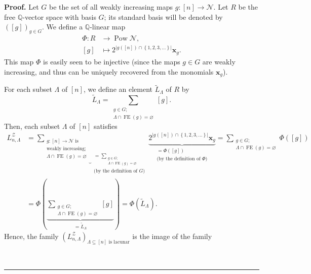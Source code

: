 \documentclass[numbers=enddot,12pt,final,onecolumn,notitlepage]{scrartcl}%
\theoremstyle{definition}
\newenvironment{proof}[1][Proof]{\noindent\textbf{#1.} }{\ \rule{0.5em}{0.5em}}
\let\sumnonlimits\sum
\renewcommand{\sum}{\sumnonlimits\limits}
\begin{document}
\begin{proof}
Let $G$ be the set of all weakly increasing maps $g:\left[  n\right]
\rightarrow\mathcal{N}$. Let $R$ be the free $\mathbb{Q}$-vector space with
basis $G$; its standard basis will be denoted by $\left(  \left[  g\right]
\right)  _{g\in G}$. We define a $\mathbb{Q}$-linear map%
\begin{align*}
\Phi:R  &  \rightarrow\operatorname*{Pow}\mathcal{N},\\
\left[  g\right]   &  \mapsto2^{\left\vert g\left(  \left[  n\right]  \right)
\cap\left\{  1,2,3,\ldots\right\}  \right\vert }\mathbf{x}_{g}.
\end{align*}
This map $\Phi$ is easily seen to be injective (since the maps $g\in G$ are
weakly increasing, and thus can be uniquely recovered from the monomials
$\mathbf{x}_{g}$).

For each subset $\Lambda$ of $\left[  n\right]  $, we define an element
$\widetilde{L}_{\Lambda}$ of $R$ by%
\[
\widetilde{L}_{\Lambda}=\sum_{\substack{g\in G;\\\Lambda\cap\operatorname*{FE}%
\left(  g\right)  =\varnothing}}\left[  g\right]  .
\]
Then, each subset $\Lambda$ of $\left[  n\right]  $ satisfies%
\begin{align*}
L_{n,\Lambda}^{\mathcal{Z}}  &  =\underbrace{\sum_{\substack{g:\left[
n\right]  \rightarrow\mathcal{N}\text{ is}\\\text{weakly increasing;}%
\\\Lambda\cap\operatorname*{FE}\left(  g\right)  =\varnothing}}}%
_{\substack{=\sum_{\substack{g\in G;\\\Lambda\cap\operatorname*{FE}\left(
g\right)  =\varnothing}}\\\text{(by the definition of }G\text{)}%
}}\underbrace{2^{\left\vert g\left(  \left[  n\right]  \right)  \cap\left\{
1,2,3,\ldots\right\}  \right\vert }\mathbf{x}_{g}}_{\substack{=\Phi\left(
\left[  g\right]  \right)  \\\text{(by the definition of }\Phi\text{)}}%
}=\sum_{\substack{g\in G;\\\Lambda\cap\operatorname*{FE}\left(  g\right)
=\varnothing}}\Phi\left(  \left[  g\right]  \right) \\
&  =\Phi\left(  \underbrace{\sum_{\substack{g\in G;\\\Lambda\cap
\operatorname*{FE}\left(  g\right)  =\varnothing}}\left[  g\right]
}_{=\widetilde{L}_{\Lambda}}\right)  =\Phi\left(  \widetilde{L}_{\Lambda
}\right)  .
\end{align*}
Hence, the family $\left(  L_{n,\Lambda}^{\mathcal{Z}}\right)  _{\Lambda
\subseteq\left[  n\right]  \text{ is lacunar}}$ is the image of the family

\end{proof}
\end{document}
